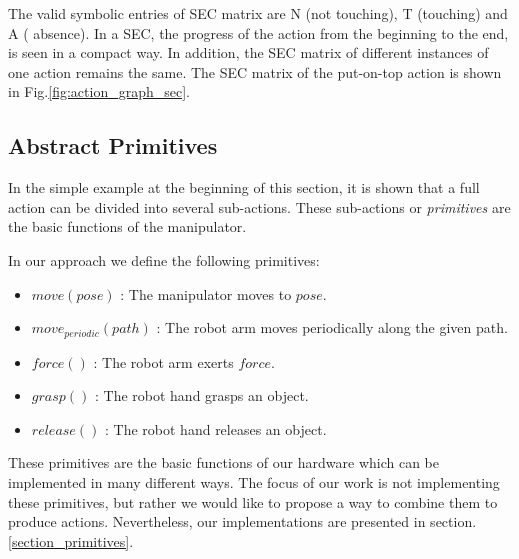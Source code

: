 The valid symbolic entries of SEC matrix are N (not touching), T (touching) and A ( absence).
In a SEC, the progress of the action from the beginning to the end, is seen in a compact way.
In addition, the SEC matrix of different instances of one action remains the same.
The SEC matrix of the put-on-top action is shown in Fig.\ref{fig:action_graph_sec}.

\subsection{Abstract Primitives}
\label{sec:abstract_primitives}
In the simple example at the beginning of this section, it is shown that a full action can be divided into several sub-actions.
These sub-actions or \textit{primitives} are the basic functions of the manipulator.

In our approach we define the following primitives:
\begin{itemize}
 \item $move(pose)$ :  The manipulator moves to $pose$.
 \item $move_{periodic}(path)$ : The robot arm moves periodically along the given path.
 \item $force()$ : The robot arm exerts $force$.
 \item $grasp()$ : The robot hand grasps an object.
 \item $release()$ : The robot hand releases an object.
\end{itemize}


These primitives are the basic functions of our hardware which can be implemented in many different ways.
The focus of our work is not implementing these primitives,
but rather we would like to propose a way to combine them to produce actions.
Nevertheless, our implementations are presented in section.\ref{section_primitives}.

